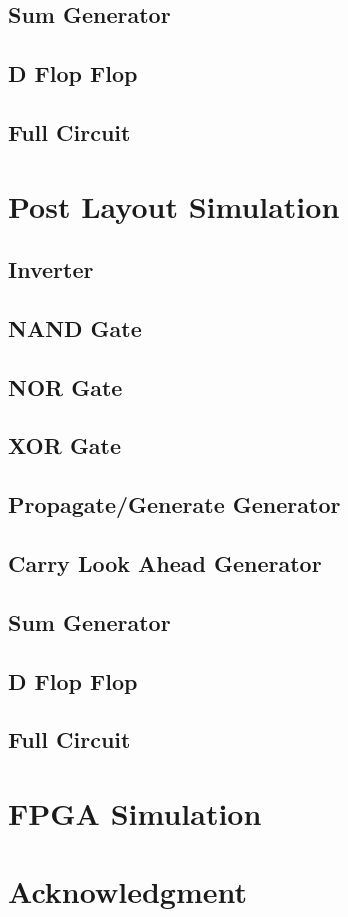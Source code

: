 \documentclass[conference]{IEEEtran}
\begin{document}
\subsection{Sum Generator}

\subsection{D Flop Flop}

\subsection{Full Circuit}

\section{Post Layout Simulation}

\subsection{Inverter}

\subsection{NAND Gate}

\subsection{NOR Gate}

\subsection{XOR Gate}

\subsection{Propagate/Generate Generator}

\subsection{Carry Look Ahead Generator}

\subsection{Sum Generator}

\subsection{D Flop Flop}

\subsection{Full Circuit}

\section{FPGA Simulation}

\section*{Acknowledgment}


\begin{thebibliography}{00}
\end{thebibliography}
\end{document}
